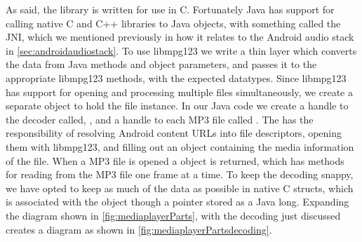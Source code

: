As said, the library is written for use in C. Fortunately Java has
support for calling native C and C++ libraries to Java objects, with
something called the \ac{JNI}, which we mentioned previously in how it relates to the Android audio stack in \cref{sec:androidaudiostack}.
To use libmpg123 we write a thin
layer which converts the data from Java methods and object parameters,
and passes it to the appropriate libmpg123 methods, with the expected
datatypes. Since libmpg123 has support for opening and processing
multiple files simultaneously, we create a separate object to hold the
file instance. In our Java code we create a handle to the decoder called, , 
and a handle to each MP3 file called .
The  has the responsibility
of resolving Android content URLs into file descriptors, opening them
with libmpg123, and filling out an object containing the media
information of the file. When a MP3 file is opened a 
object is returned, which has methods for reading from the MP3 file one
frame at a time. To keep the decoding snappy, we have opted to keep as
much of the data as possible in native C structs, which is associated
with the  object though a pointer stored as a Java long.
Expanding the diagram shown in \cref{fig:mediaplayerParts}, with the
decoding just discussed creates a diagram as shown in
\cref{fig:mediaplayerPartsdecoding}.


